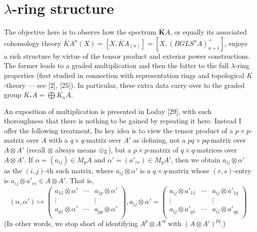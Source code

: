 \chapter{$\lambda$-ring structure} %
\label{cha:13lambda_ring_structure}
The objective here is to observe how the spectrum $\bar{\mathbf{K}}A$, or equally its associated cohomology theory $\bar{K}A^n(X) = [X, \bar{K}A_{(n)}]=[X,(BGLS^nA)^+_{n+1}]$, enjoys a rich structure by virtue of the tensor product and exterior power constructions. The former leads to a graded multiplication and then the latter to the full $\lambda$-ring properties (first studied in connection with representation rings and topological $K$-theory --- see [2], [25]). In particular, these extra data carry over to the graded group $K_*A = \bigoplus K_nA$.

An exposition of multiplication is presented in Loday [29], with such thoroughness that there is nothing to be gained by repeating it here. Instead I offer the following treatment, Its key idea is to view the tensor product of a $p\times p$-matrix over $A$ with a $q\times q$-matrix over $A'$ as defining, not a $pq\times pq$-matrix over $A \otimes A'$ (recall $\otimes$ always means $\otimes_{\mathbb{Z}}$), but a $p\times p$-matrix of $q\times q$-matrices over$ A \otimes A'$. If $\alpha = (a_{ij}) \in M_pA$ and $\alpha' = (a'_{rs}) \in M_qA'$, then we obtain $a_{ij}\otimes \alpha'$ as the $(i, j)$-th such matrix, where $a_{ij}\otimes \alpha'$ is a $q\times q$-matrix whose $(r, s)$-entry is $a_{ij}\otimes a'_{rs} \in A \otimes A'$. That is,
\[(\alpha,\alpha')\mapsto \begin{pmatrix}
  a_{11}\otimes \alpha' &\cdots & a_{1p}\otimes \alpha' \\
  \vdots & &\vdots \\
  a_{p1}\otimes \alpha' &\cdots & a_{pp}\otimes \alpha' \\
\end{pmatrix}, a_{ij}\otimes \alpha' =
\begin{pmatrix}
  a_{ij}\otimes a'_{11} &\cdots & a_{ij}\otimes a'_{1q} \\
  \vdots & &\vdots \\
  a_{ij}\otimes a'_{q1} &\cdots & a_{ij}\otimes a'_{qq} \\
\end{pmatrix}\]   
(In other words, we stop short of identifying $A^p\otimes {A'}^q$ with $(A \otimes A')^{pq}$.)

